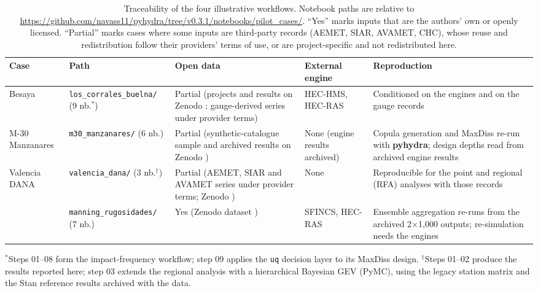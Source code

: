 \documentclass[preprint,12pt,a4paper]{elsarticle}
\newcommand{\pyhydra}{\textbf{pyhydra}}
\begin{document}
\begin{table}[!b]
\small
\centering
\caption{Traceability of the four illustrative workflows. Notebook paths
are relative to
\url{https://github.com/navass11/pyhydra/tree/v0.3.1/notebooks/pilot_cases/}.
``Yes'' marks inputs that are the authors' own or openly licensed.
``Partial'' marks cases where some inputs are third-party records (AEMET,
SIAR, AVAMET, CHC), whose reuse and redistribution follow their providers'
terms of use, or are project-specific and not redistributed here.}
\label{tab:reproducibility}
\setlength{\tabcolsep}{3pt}
\begin{tabular}{@{}>{\raggedright\arraybackslash}p{}>{\raggedright\arraybackslash}p{}>{\raggedright\arraybackslash}p{}>{\raggedright\arraybackslash}p{}>{\raggedright\arraybackslash}p{}@{}}
\toprule
Case & Path & Open data & External engine & Reproduction \\
\midrule
Besaya &
\texttt{los\_\allowbreak corrales\_\allowbreak buelna/} (9 nb.$^{\ast}$) &
Partial (projects and results on Zenodo \citep{navas2026pilotdata}; gauge-derived series under provider terms) & HEC-HMS, HEC-RAS & Conditioned on the engines and on the gauge records \\[4pt]
M-30 Manzanares &
\texttt{m30\_\allowbreak manzanares/} (6 nb.) &
Partial (synthetic-catalogue sample and archived results on Zenodo \citep{navas2026pilotdata}) & None (engine results archived) &
Copula generation and MaxDiss re-run with \pyhydra{}; design depths read from archived engine results \\[4pt]
Valencia DANA &
\texttt{valencia\_\allowbreak dana/} (3 nb.$^{\dagger}$) &
Partial (AEMET, SIAR and AVAMET series under provider terms; Zenodo \citep{navas2026pilotdata}) & None &
Reproducible for the point and regional (RFA) analyses with those
records \\[4pt]
{\fontsize{9}{10}\selectfont SFINCS--HEC-RAS} &
\texttt{manning\_\allowbreak rugosidades/} (7 nb.) &
Yes (Zenodo dataset \citep{navas2026besayadata}) &
SFINCS, HEC-RAS & Ensemble aggregation re-runs from the archived 2$\times$1{,}000 outputs; re-simulation needs the engines \\
\bottomrule
\end{tabular}

\vspace{2pt}
{\footnotesize $^{\ast}$Steps 01--08 form the impact-frequency workflow;
step 09 applies the \texttt{uq} decision layer to its MaxDiss design.
$^{\dagger}$Steps 01--02 produce the results reported here; step 03 extends the
regional analysis with a hierarchical Bayesian GEV (PyMC), using the legacy
station matrix and the Stan reference results archived with the data.}
\end{table}
\end{document}
